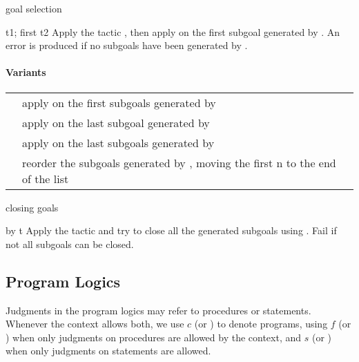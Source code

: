 \begin{tactic}[t1; first t2]{goal selection}
  \begin{tsyntax}[empty]{t1; first t2}
  Apply the tactic , then apply  on the first subgoal
  generated by . An error is produced if no subgoals have been
  generated by .

  \paragraph{Variants}\strut

  \noindent\begin{tabularx}{\textwidth}{@{}ll@{}}
  {\ec{t1; first n t2}} & apply {\ec{t2}} on the first {\ec{n}} subgoals
    generated by {\ec{t1}}\\
  {\ec{t1; last t2}} & apply {\ec{t2}} on the last subgoal
    generated by {\ec{t1}}\\
  {\ec{t1; last n t2}} & apply {\ec{t2}} on the last {\ec{n}} subgoals
    generated by {\ec{t1}}\\
  {\ec{t; first n last}} & \parbox{200pt}{reorder the subgoals generated by {}, moving
    the first n to the end of the list}
  \end{tabularx}
  \end{tsyntax}
\end{tactic}

\begin{tactic}[by t]{closing goals}
  \begin{tsyntax}[empty]{by t}
  Apply the tactic  and try to close all the generated subgoals using
  . Fail if not all subgoals can be closed.
  \end{tsyntax}
\end{tactic}

\subsection{Program Logics}

Judgments in the program logics may refer to procedures or
statements. Whenever the context allows both, we use $c$ (or )
to denote programs, using $f$ (or ) when only judgments on
procedures are allowed by the context, and $s$ (or ) when only
judgments on statements are allowed.

